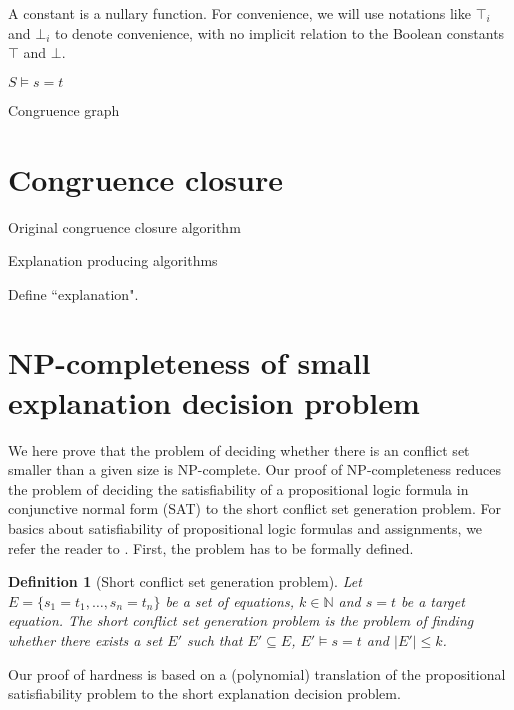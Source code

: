 \documentclass{easychair}
\newtheorem{definition}{Definition}
\begin{document}
A constant is a nullary function.  For convenience, we will use notations like $\top_i$ and $\bot_i$ to denote convenience, with no implicit relation to the Boolean constants $\top$ and $\bot$.

$S \models s=t$

Congruence graph

\section*{Congruence closure}

Original congruence closure algorithm~\cite{}

Explanation producing algorithms~\cite{}

Define ``explanation".



\section*{NP-completeness of small explanation decision problem}
\label{sec:npcomplete}

We here prove that the problem of deciding whether there is an conflict set
smaller than a given size is NP-complete.  Our proof of NP-completeness reduces
the problem of deciding the satisfiability of a propositional logic formula in
conjunctive normal form (SAT) to the short conflict set generation problem.  For
basics about satisfiability of propositional logic formulas and assignments, we
refer the reader to \cite{Biere3}.  First, the problem has to be formally
defined.

\begin{definition}[Short conflict set generation problem]
Let $E = \{ s_1 = t_1,\ldots, s_n = t_n\}$ be a set of equations, $k \in
\mathbb{N}$ and $s = t$ be a target equation.  The \emph{short conflict set
  generation problem} is the problem of finding whether there exists a set $E'$
such that $E' \subseteq E$, $E' \models s = t$ and $|E'| \leq k$.
\end{definition}

\noindent Our proof of hardness is based on a (polynomial) 
translation of the propositional satisfiability problem to 
the short explanation decision problem.

\newcommand{\Assignment}{{\it Assignment}}
\newcommand{\Clause}{{\it Clause}}
\newcommand{\Connect}{{\it Connect}}
\end{document}
